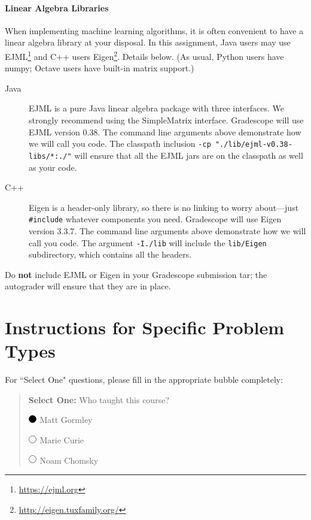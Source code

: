 \documentclass[11pt,addpoints,answers]{exam}
\numberwithin{equation}{section} %
\numberwithin{figure}{section} %
\numberwithin{table}{section} %
\newcommand{\blackcircle}{\tikz\draw[black,fill=black] (0,0) circle (1ex);}
\renewcommand{\circle}{\tikz\draw[black] (0,0) circle (1ex);}
\begin{document}
\begin{notebox}
\paragraph{Linear Algebra Libraries} When implementing machine learning algorithms, it is often convenient to have a linear algebra library at your disposal. In this assignment, Java users may use EJML\footnote{\url{https://ejml.org}} and C++ users Eigen\footnote{\url{http://eigen.tuxfamily.org/}}. Details below. 
%
(As usual, Python users have numpy; Octave users have built-in matrix support.)
%
\begin{description}
\item[Java] EJML is a pure Java linear algebra package with three interfaces. We strongly recommend using the SimpleMatrix interface. Gradescope will use EJML version 0.38. The command line arguments above demonstrate how we will call you code. The classpath inclusion \lstinline{-cp "./lib/ejml-v0.38-libs/*:./"} will ensure that all the EJML jars are on the classpath as well as your code. 
\item[C++] Eigen is a header-only library, so there is no linking to worry about---just \lstinline{#include} whatever components you need. Gradescope will use Eigen version 3.3.7. The command line arguments above demonstrate how we will call you code. The argument \lstinline{-I./lib} will include the \lstinline{lib/Eigen} subdirectory, which contains all the headers.
\end{description} 
Do {\bf not} include EJML or Eigen in your Gradescope submission tar; the autograder will ensure that they are in place. 
\end{notebox}

\clearpage
\section*{Instructions for Specific Problem Types}

For ``Select One" questions, please fill in the appropriate bubble completely:

\begin{quote}
\textbf{Select One:} Who taught this course?
\begin{list}{}
     \item $\blackcircle$ Matt Gormley
     \item $\circle$ Marie Curie
     \item $\circle$ Noam Chomsky
\end{list}
\end{quote}
\end{document}
